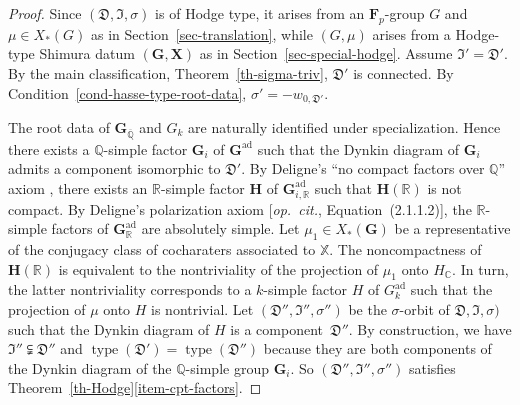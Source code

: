 \documentclass[11pt]{amsart}
\numberwithin{equation}{section}
\theoremstyle{definition}
\theoremstyle{remark}
\newcommand{\Dfr}{{\mathfrak D}}
\newcommand{\Ifr}{{\mathfrak I}}
\newcommand{\CC}{\mathbb{C}}
\newcommand{\QQ}{\mathbb{Q}}
\newcommand{\RR}{\mathbb{R}}
\newcommand{\XX}{\mathbb{X}}
\newcommand{\fp}{\mathbf F_p}
\DeclareMathOperator{\ad}{ad}
\newcommand{\gx}{(\mathbf G, \mathbf X)}
\newcommand{\opcitn}{{\em op.\ cit.}}
\DeclareMathOperator{\type}{type}
\begin{document}
\begin{proof}
Since $(\Dfr, \Ifr, \sigma)$ is of Hodge type, it arises from an $\fp$-group $G$ and $\mu \in X_*(G)$ as in Section~\ref{sec-translation}, while $(G,\mu)$ arises from a Hodge-type Shimura datum $\gx$ as in Section~\ref{sec-special-hodge}.  Assume $\Ifr'=\Dfr'$. By the main classification, Theorem~\ref{th-sigma-triv}, $\Dfr'$ is connected. By Condition~\ref{cond-hasse-type-root-data}, $\sigma'=-w_{0, \Dfr'}$. 

The root data of $\mathbf{G}_{\overline{\QQ}}$ and $G_k$ are naturally identified under specialization. 
Hence there exists a $\QQ$-simple factor $\mathbf{G}_i$ of $\mathbf{G}^{\ad}$ such that the Dynkin diagram of $\mathbf{G}_i$ admits a component  isomorphic to $\Dfr'$.  
By Deligne's  ``no compact factors over $\QQ$'' axiom \cite[Equation~(2.1.1.3)]{Deligne-Shimura-varieties},  there exists an $\RR$-simple factor $\mathbf{H}$ of $\mathbf{G}_{i, \RR}^{\ad}$ such that $\mathbf{H}(\RR)$ is not compact.  
By Deligne's polarization axiom [\opcitn, Equation~(2.1.1.2)], the $\RR$-simple factors of $\mathbf{G}_{\RR}^{\ad}$ are absolutely simple. 
Let $\mu_1 \in X_*(\mathbf{G})$ be a representative of the conjugacy class of cocharaters associated to $\XX$. 
The noncompactness of $\mathbf{H}(\RR)$ is equivalent to the nontriviality of the projection of $\mu_1$ onto $H_{\CC}$. 
In turn, the latter nontriviality corresponds to a $k$-simple factor $H$ of $G_k^{\ad}$ such that the projection of $\mu$ onto $H$ is nontrivial. 
Let $(\Dfr'', \Ifr'', \sigma'')$ be the $\sigma$-orbit of $\Dfr, \Ifr, \sigma)$ such that the Dynkin diagram of $H$ is a component~$\Dfr''$. By construction, we have $\Ifr'' \subsetneqq \Dfr''$ and $\type(\Dfr')=\type(\Dfr'')$ because they are both components of the Dynkin diagram of the $\QQ$-simple group $\mathbf{G}_i$.  
So $(\Dfr'', \Ifr'', \sigma'')$ satisfies Theorem~\ref{th-Hodge}\eqref{item-cpt-factors}.
\end{proof}
\end{document}
